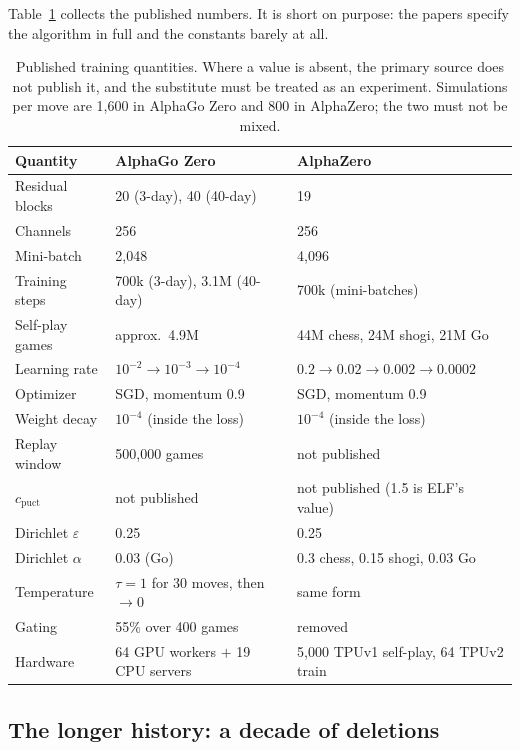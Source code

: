Table~\ref{tab:hyper} collects the published numbers. It is short on purpose:
the papers specify the algorithm in full and the constants barely at all.

\begin{table}[t]
\centering
\small
\caption{Published training quantities. Where a value is absent, the primary
source does not publish it, and the substitute must be treated as an experiment.
Simulations per move are 1{,}600 in AlphaGo Zero and 800 in AlphaZero; the two
must not be mixed.}
\label{tab:hyper}
\begin{tabularx}{\textwidth}{@{}l X X@{}}
\toprule
Quantity & AlphaGo Zero & AlphaZero \\
\midrule
Residual blocks & 20 (3-day), 40 (40-day) & 19 \\
Channels & 256 & 256 \\
Mini-batch & 2{,}048 & 4{,}096 \\
Training steps & 700k (3-day), 3.1M (40-day) & 700k (mini-batches) \\
Self-play games & approx.\ 4.9M & 44M chess, 24M shogi, 21M Go \\
Learning rate & $10^{-2} \to 10^{-3} \to 10^{-4}$ &
$0.2 \to 0.02 \to 0.002 \to 0.0002$ \\
Optimizer & SGD, momentum 0.9 & SGD, momentum 0.9 \\
Weight decay & $10^{-4}$ (inside the loss) & $10^{-4}$ (inside the loss) \\
Replay window & 500{,}000 games & not published \\
$c_{\mathrm{puct}}$ & not published & not published (1.5 is ELF's value) \\
Dirichlet $\varepsilon$ & 0.25 & 0.25 \\
Dirichlet $\alpha$ & 0.03 (Go) & 0.3 chess, 0.15 shogi, 0.03 Go \\
Temperature & $\tau = 1$ for 30 moves, then $\to 0$ & same form \\
Gating & 55\% over 400 games & removed \\
Hardware & 64 GPU workers $+$ 19 CPU servers & 5{,}000 TPUv1 self-play, 64 TPUv2 train \\
\bottomrule
\end{tabularx}
\end{table}

\subsection{The longer history: a decade of deletions}
\label{sec:history}

